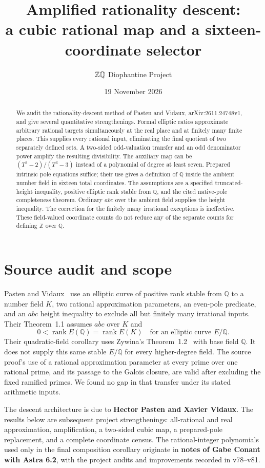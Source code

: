 \documentclass[11pt,a4paper]{article}
\title{Amplified rationality descent:\\a cubic rational map and a sixteen-coordinate selector}
\author{\(\Z\Q\) Diophantine Project}
\date{19 November 2026}
\newcommand{\Q}{\mathbb Q}\newcommand{\Z}{\mathbb Z}
\begin{document}
\maketitle
\begin{abstract}
We audit the rationality-descent method of Pasten and Vidaux,
arXiv:2611.24748v1, and give several quantitative strengthenings.
Formal elliptic ratios approximate arbitrary rational targets
simultaneously at the real place and at finitely many finite places.
This supplies every rational input, eliminating the final quotient of
two separately defined sets. A two-sided odd-valuation transfer and an
odd denominator power amplify the resulting divisibility. The auxiliary
map can be $(T^3-2)/(T^3-3)$ instead of a polynomial of degree at least
seven. Prepared intrinsic pole equations suffice; their use gives a
definition of $\Q$ inside the ambient number field in sixteen total
coordinates. The assumptions are a specified truncated-height inequality,
positive elliptic rank stable from $\Q$, and the cited native-pole
completeness theorem. Ordinary $abc$ over the ambient field supplies the
height inequality. The correction for the finitely many irrational
exceptions is ineffective. These field-valued coordinate counts do not
reduce any of the separate counts for defining $\Z$ over $\Q$.
\end{abstract}

\section{Source audit and scope}

Pasten and Vidaux~\cite{PV} use an elliptic curve of positive rank
stable from $\Q$ to a number field $K$, two rational approximation
parameters, an even-pole predicate, and an $abc$ height inequality to
exclude all but finitely many irrational inputs. Their Theorem~1.1
assumes $abc$ over $K$ and
\[
 0<\operatorname{rank}E(\Q)=\operatorname{rank}E(K)
 \quad\text{for an elliptic curve }E/\Q.
\]
Their quadratic-field corollary uses Zywina's Theorem~1.2~\cite{Zywina}
with base field $\Q$. It does not supply this same stable $E/\Q$
for every higher-degree field. The source proof's use of a rational
approximation parameter at every prime over one rational prime, and its
passage to the Galois closure, are valid after excluding the fixed
ramified primes. We found no gap in that transfer under its stated
arithmetic inputs.

The descent architecture is due to \textbf{Hector Pasten and Xavier
Vidaux}. The results below are subsequent project strengthenings:
all-rational and real approximation, amplification, a two-sided cubic
map, a prepared-pole replacement, and a complete coordinate census.
The rational-integer polynomials used only in the final composition
corollary originate in \textbf{notes of Gabe Conant with Astra 6.2},
with the project audits and improvements recorded in v78--v81.
\end{document}
